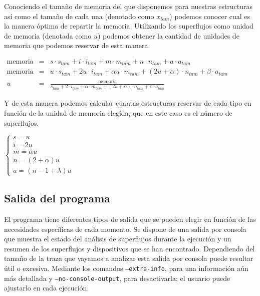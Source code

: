 \documentclass[twoside, 12pt]{epstfg}
\begin{document}
Conociendo el tamaño de memoria del que disponemos para nuestras estructuras así como el tamaño de cada una (denotado como $x_{tam}$) podemos conocer cual es la manera óptima de repartir la memoria. Utilizando los superflujos como unidad de memoria (denotada como $u$) podemos obtener la cantidad de unidades de memoria que podemos reservar de esta manera.

$\begin{array}{lcl}
	\mathrm{memoria} & = & s \cdot s_{tam} + i \cdot i_{tam} + m \cdot m_{tam} + n \cdot n_{tam} + a \cdot a_{tam}\\
	\mathrm{memoria} & = & u \cdot s_{tam} + 2u \cdot i_{tam} + \alpha u \cdot m_{tam} + (2u+\alpha) \cdot n_{tam} + \beta \cdot a_{tam} \\
	u & = & \frac{\mathrm{memoria}}{s_{tam} + 2 \cdot i_{tam} + \alpha \cdot m_{tam} + (2u+\alpha) \cdot n_{tam} + \beta \cdot a_{tam}}
\end{array}$

Y de esta manera podemos calcular cuantas estructuras reservar de cada tipo en función de la unidad de memoria elegida, que en este caso es el número de superflujos.

$\begin{cases}
	s = u\\ 
	i = 2u\\ 
	m = \alpha u\\
	n = (2+\alpha)u\\
	a = (n - 1 + \lambda) u
\end{cases}$

\subsection{Salida del programa}
El programa tiene diferentes tipos de salida que se pueden elegir en función de las necesidades específicas de cada momento. Se dispone de una salida por consola que muestra el estado del análisis de superflujos durante la ejecución y un resumen de los superflujos y dispositivos que se han encontrado. Dependiendo del tamaño de la traza que vayamos a analizar esta salida por consola puede resultar útil o excesiva. Mediante los comandos \texttt{--extra-info}, para una información aún más detallada y \texttt{--no-console-output}, para desactivarla; el usuario puede ajustarlo en cada ejecución.
\end{document}
